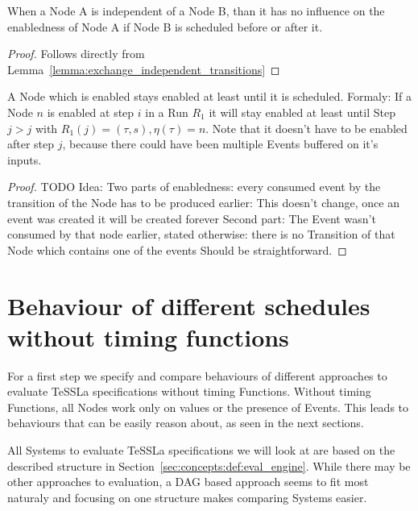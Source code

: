 \begin{lemma}[name = Influence of independent Nodes]\label{lemma:independent_nodes}
  When a Node A is independent of a Node B, than it has no influence on the enabledness of Node A if Node B is scheduled before or after it.
\end{lemma}

\begin{proof}
  Follows directly from Lemma~\ref{lemma:exchange_independent_transitions}
\end{proof}

\begin{lemma}[name = Duration of Enabledness]\label{lemma:enabled_till_scheduled}
  A Node which is enabled stays enabled at least until it is scheduled.
  Formaly: If a Node \(n\) is enabled at step \(i\) in a Run \(R_1\) it will stay enabled at least until Step \(j > j\) with \(R_1(j) = (\tau,s), \eta(\tau) = n\).
  Note that it doesn't have to be enabled after step \(j\), because there could have been multiple Events buffered on it's inputs.
\end{lemma}

\begin{proof}
TODO Idea: Two parts of enabledness: every consumed event by the transition of the Node has to be produced earlier: This doesn't change, once an event was created it will be created forever
Second part: The Event wasn't consumed by that node earlier, stated otherwise: there is no Transition of that Node which contains one of the events
Should be straightforward.
\end{proof}


\section{Behaviour of different schedules without timing functions}
\label{sec:concepts:behaviour_without_timing}

For a first step we specify and compare behaviours of different approaches to evaluate TeSSLa specifications without timing Functions.
Without timing Functions, all Nodes work only on values or the presence of Events.
This leads to behaviours that can be easily reason about, as seen in the next sections.

All Systems to evaluate TeSSLa specifications we will look at are based on the described structure in Section~\ref{sec:concepts:def:eval_engine}.
While there may be other approaches to evaluation, a DAG based approach seems to fit most naturaly and focusing on one structure makes comparing Systems easier.

